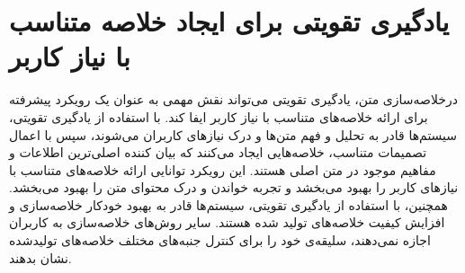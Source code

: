 	  
\section{ یادگیری تقویتی برای ایجاد خلاصه متناسب با نیاز کاربر}
درخلاصه‌سازی متن، یادگیری تقویتی می‌تواند نقش مهمی به عنوان یک رویکرد پیشرفته برای ارائه خلاصه‌های متناسب با نیاز کاربر ایفا کند. با استفاده از یادگیری تقویتی، سیستم‌ها قادر به تحلیل و فهم متن‌ها و درک نیازهای کاربران می‌شوند، سپس با اعمال تصمیمات متناسب، خلاصه‌هایی ایجاد می‌کنند که بیان کننده اصلی‌ترین اطلاعات و مفاهیم موجود در متن اصلی هستند. این رویکرد توانایی ارائه خلاصه‌های متناسب با نیازهای کاربر را بهبود می‌بخشد و تجربه خواندن و درک محتوای متن را بهبود می‌بخشد. همچنین، با استفاده از یادگیری تقویتی، سیستم‌ها قادر به بهبود خودکار خلاصه‌سازی و افزایش کیفیت خلاصه‌های تولید شده هستند. %
سایر روش‌های خلاصه‌سازی به کاربران اجازه نمی‌دهند، سلیقه‌ی خود را برای کنترل  جنبه‌های مختلف خلاصه‌های تولیدشده نشان بدهند. 

